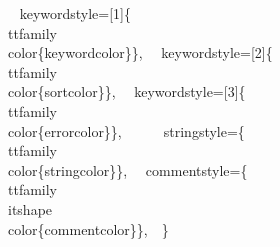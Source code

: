 {%
\
keywordstyle=[1]\{\\ttfamily\\color\{keywordcolor\}\},\
\
keywordstyle=[2]\{\\ttfamily\\color\{sortcolor\}\},\
\
keywordstyle=[3]\{\\ttfamily\\color\{errorcolor\}\},\
\
\
\
stringstyle=\{\\ttfamily\\color\{stringcolor\}\},\
\
commentstyle=\{\\ttfamily\\itshape\\color\{commentcolor\}\},\
\
\}}